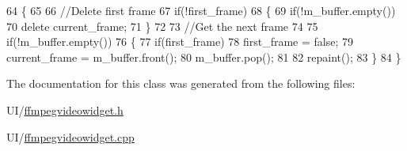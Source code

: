 \begin{DoxyCode}
64 \{
65 
66     \textcolor{comment}{//Delete first frame}
67     \textcolor{keywordflow}{if}(!first\_frame)
68     \{
69         \textcolor{keywordflow}{if}(!m\_buffer.empty())
70             \textcolor{keyword}{delete} current\_frame;
71     \}
72 
73     \textcolor{comment}{//Get the next frame}
74 
75     \textcolor{keywordflow}{if}(!m\_buffer.empty())
76     \{
77         \textcolor{keywordflow}{if}(first\_frame)
78             first\_frame = \textcolor{keyword}{false};
79         current\_frame = m\_buffer.front();
80         m\_buffer.pop();
81 
82         repaint();
83     \}
84 \}
\end{DoxyCode}


The documentation for this class was generated from the following files\-:\begin{DoxyCompactItemize}
\item 
U\-I/\hyperlink{ffmpegvideowidget_8h}{ffmpegvideowidget.\-h}\item 
U\-I/\hyperlink{ffmpegvideowidget_8cpp}{ffmpegvideowidget.\-cpp}\end{DoxyCompactItemize}

